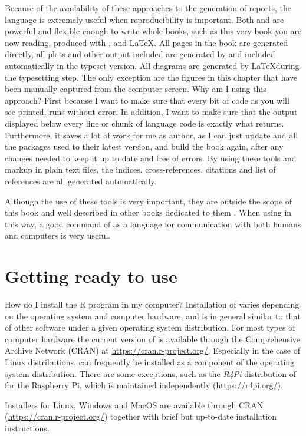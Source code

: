 \documentclass[krantz2]{krantz}\usepackage{knitr}
\begin{document}
Because of the availability of these approaches to the generation of reports, the \Rlang language is extremely useful when reproducibility is important. Both  and \Quarto are powerful and flexible enough to write whole books, such as this very book you are now reading, produced with \Rpgrm,  and \LaTeX. All pages in the book are generated directly, all plots and other \Rlang output included are generated by \Rpgrm and included automatically in the typeset version. All diagrams are generated by \LaTeX during the typesetting step. The only exception are the figures in this chapter that have been manually captured from the computer screen. Why am I using this approach? First because I want to make sure that every bit of code as you will see printed, runs without error. In addition, I want to make sure that the output displayed below every line or chunk of \Rlang language code is exactly what \Rpgrm returns. Furthermore, it saves a lot of work for me as author, as I can just update \Rpgrm and all the packages used to their latest version, and build the book again, after any changes needed to keep it up to date and free of errors. By using these tools and markup in plain text files, the indices, cross-references, citations and list of references are all generated automatically.

Although the use of these tools is very important, they are outside the scope of this book and well described in other books dedicated to them \autocite{Gandrud2015,Xie2013}. When using \Rlang in this way, a good command of \Rlang as a language for communication with both humans and computers is very useful.

\section{Getting ready to use \Rlang}

\begin{faqbox}{How do I install the \textsf{R} program in my computer?}
Installation of \Rpgrm varies depending on the operating system and computer hardware, and is in general similar to that of other software under a given operating system distribution. For most types of computer hardware the current version of \Rpgrm is available through the Comprehensive \Rlang Archive Network (CRAN) at \url{https://cran.r-project.org/}. Especially in the case of Linux distributions, \Rpgrm can frequently be installed as a component of the operating system distribution. There are some exceptions, such as the \textsl{R4Pi} distribution of \Rpgrm for the Raspberry Pi, which is maintained independently (\url{https://r4pi.org/}).

Installers for Linux, Windows and MacOS are available through CRAN (\url{https://cran.r-project.org/}) together with brief but up-to-date installation instructions.
\end{faqbox}
\end{document}
